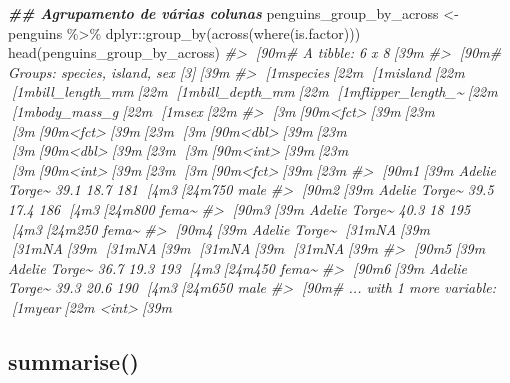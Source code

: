 \documentclass[
]{book}
\newenvironment{Shaded}{\begin{snugshade}}{\end{snugshade}}
\newcommand{\CommentTok}[1]{\textcolor[rgb]{0.37,0.37,0.37}{\textit{#1}}}
\newcommand{\DocumentationTok}[1]{\textcolor[rgb]{0.37,0.37,0.37}{\textbf{\textit{#1}}}}
\newcommand{\FunctionTok}[1]{\textcolor[rgb]{0,0,0}{#1}}
\newcommand{\NormalTok}[1]{#1}
\newcommand{\OtherTok}[1]{\textcolor[rgb]{0.37,0.37,0.37}{#1}}
\newcommand{\SpecialCharTok}[1]{\textcolor[rgb]{0,0,0}{#1}}
\begin{document}
\begin{Shaded}
\begin{Highlighting}[]
\DocumentationTok{\#\# Agrupamento de várias colunas}
\NormalTok{penguins\_group\_by\_across }\OtherTok{\textless{}{-}}\NormalTok{ penguins }\SpecialCharTok{\%\textgreater{}\%} 
\NormalTok{  dplyr}\SpecialCharTok{::}\FunctionTok{group\_by}\NormalTok{(}\FunctionTok{across}\NormalTok{(}\FunctionTok{where}\NormalTok{(is.factor)))}
\FunctionTok{head}\NormalTok{(penguins\_group\_by\_across)}
\CommentTok{\#\textgreater{} [90m\# A tibble: 6 x 8[39m}
\CommentTok{\#\textgreater{} [90m\# Groups:   species, island, sex [3][39m}
\CommentTok{\#\textgreater{}   [1mspecies[22m [1misland[22m [1mbill\_length\_mm[22m [1mbill\_depth\_mm[22m [1mflipper\_length\_\textasciitilde{}[22m [1mbody\_mass\_g[22m [1msex[22m  }
\CommentTok{\#\textgreater{}   [3m[90m\textless{}fct\textgreater{}[39m[23m   [3m[90m\textless{}fct\textgreater{}[39m[23m           [3m[90m\textless{}dbl\textgreater{}[39m[23m         [3m[90m\textless{}dbl\textgreater{}[39m[23m            [3m[90m\textless{}int\textgreater{}[39m[23m       [3m[90m\textless{}int\textgreater{}[39m[23m [3m[90m\textless{}fct\textgreater{}[39m[23m}
\CommentTok{\#\textgreater{} [90m1[39m Adelie  Torge\textasciitilde{}           39.1          18.7              181        [4m3[24m750 male }
\CommentTok{\#\textgreater{} [90m2[39m Adelie  Torge\textasciitilde{}           39.5          17.4              186        [4m3[24m800 fema\textasciitilde{}}
\CommentTok{\#\textgreater{} [90m3[39m Adelie  Torge\textasciitilde{}           40.3          18                195        [4m3[24m250 fema\textasciitilde{}}
\CommentTok{\#\textgreater{} [90m4[39m Adelie  Torge\textasciitilde{}           [31mNA[39m            [31mNA[39m                 [31mNA[39m          [31mNA[39m [31mNA[39m   }
\CommentTok{\#\textgreater{} [90m5[39m Adelie  Torge\textasciitilde{}           36.7          19.3              193        [4m3[24m450 fema\textasciitilde{}}
\CommentTok{\#\textgreater{} [90m6[39m Adelie  Torge\textasciitilde{}           39.3          20.6              190        [4m3[24m650 male }
\CommentTok{\#\textgreater{} [90m\# ... with 1 more variable: [1myear[22m \textless{}int\textgreater{}[39m}
\end{Highlighting}
\end{Shaded}

\hypertarget{summarise}{%
\subsection{summarise()}\label{summarise}}
\end{document}
